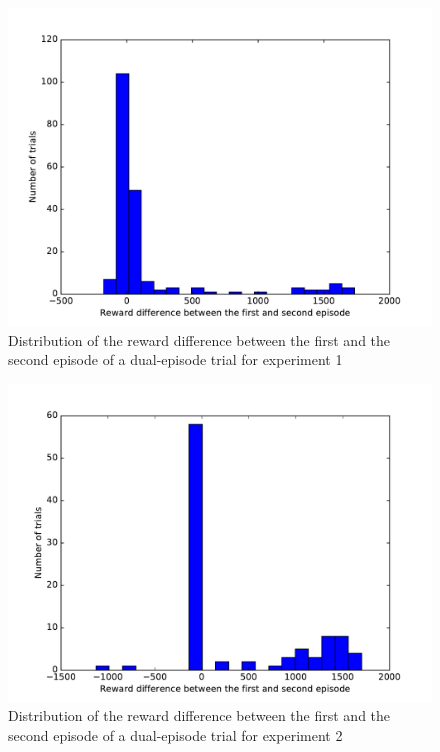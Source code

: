 \documentclass[letterpaper]{article}
\begin{document}
\begin{figure}[h!]
	\centering
	\includegraphics[width=\linewidth]{fig/reward_diff.pdf}
	\caption{Distribution of the reward difference between the first
	and the second episode of a dual-episode trial for experiment 1}
	\label{fig:reward_diff}
\end{figure}
\begin{figure}[h!]
	\centering
	\includegraphics[width=\linewidth]{fig/reward_diff_cunseen.pdf}
	\caption{Distribution of the reward difference between the first
	and the second episode of a dual-episode trial for experiment 2}
	\label{fig:reward_diff_cunseen}
\end{figure}
\end{document}
